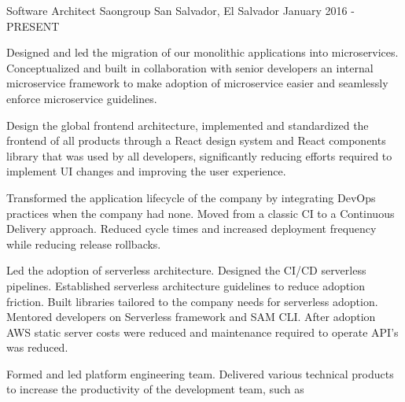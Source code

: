 

\begin{cventries}

  \cventry
    {Software Architect} %
    {Saongroup} %
    {San Salvador, El Salvador} %
    {January 2016 - PRESENT} %
    {
      \begin{cvitems} %
        \item {
          Designed and led the migration of our monolithic applications into microservices. Conceptualized and built in collaboration with senior developers an internal microservice framework to make adoption of microservice easier and seamlessly enforce microservice guidelines.
        }
        \item {
          Design the global frontend architecture, implemented and standardized
          the frontend of all products through a React design system and React
          components library that was used by all developers, significantly reducing efforts
          required to implement UI changes and improving the user experience.
        }
        \item {
          Transformed the application lifecycle of the company by integrating
          DevOps practices when the company had none. Moved from a classic CI to
          a Continuous Delivery approach. Reduced cycle times and increased
          deployment frequency while reducing release rollbacks.
        }
        \item {
          Led the adoption of serverless architecture. Designed the CI/CD serverless pipelines. Established serverless architecture guidelines to reduce adoption friction. Built libraries tailored to the company needs for serverless adoption. Mentored developers on Serverless framework and SAM CLI. After adoption AWS static server costs were reduced and maintenance required to operate API's was reduced.
        }
        \item {
          Formed and led platform engineering team. Delivered various technical
          products to increase the productivity of the development team, such as
}
\end{cvitems}}
\end{cventries}
